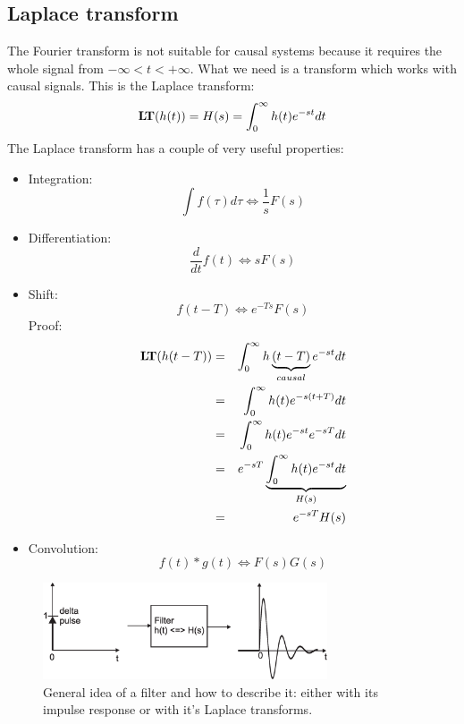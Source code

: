 \documentclass[12pt,a4paper]{article}
\def\lapl#1{{\mathrm{\bf L\!T}({#1})}}
\begin{document}
\subsection{Laplace transform}
The Fourier transform is not suitable for causal systems
because it requires the whole signal from $-\infty < t < +\infty$.
What we need is a transform which works with causal signals.
This is the Laplace transform:
\begin{equation} 
\lapl{h(t)} = H(s) = \int_{0}^{\infty} h(t) e^{-st} dt
\label{lapltrans}
\end{equation}
The Laplace transform has a couple of very useful properties:
\begin{itemize}
\item Integration: 
\begin{equation}
\int f(\tau) d\tau \Leftrightarrow \frac{1}{s} F(s)
\end{equation}
\item Differentiation:
\begin{equation}
\frac{d}{dt} f(t) \Leftrightarrow s F(s) 
\end{equation}
\item Shift:
\begin{equation}
f(t - T) \Leftrightarrow e^{-Ts} F(s)
\label{shiftOperation}
\end{equation}
Proof:
\begin{eqnarray}
\lapl{h(t - T)} & = &\int_{0}^{\infty} h\underbrace{(t - T)}_{causal} e^{-st} dt \\
& = & \int_{0}^{\infty} h(t) e^{-s(t + T)} dt \\
& = & \int_{0}^{\infty} h(t) e^{-st} e^{-sT} dt \\
& = & e^{-sT} \underbrace{\int_{0}^{\infty} h(t) e^{-st} dt}_{H(s)} \\
& = & e^{-sT} H(s)
\end{eqnarray}

\item Convolution:
\begin{equation} 
f(t) * g(t) \Leftrightarrow F(s) G(s)
\end{equation}
\end{itemize}




\begin{figure}[!hbt]
\begin{center}
\mbox{\includegraphics[width=0.75\textwidth]{filter}}
\end{center}
\caption{General idea of a filter and how to describe it:
either with its impulse response or with it's Laplace transforms.
\label{filter}}
\end{figure}
\end{document}

